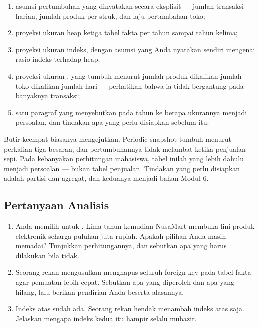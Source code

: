 \begin{enumerate}[leftmargin=1.4em]
  \item asumsi pertumbuhan yang dinyatakan secara eksplisit --- jumlah
        transaksi harian, jumlah produk per struk, dan laju pertambahan toko;
  \item proyeksi ukuran heap ketiga tabel fakta per tahun sampai tahun kelima;
  \item proyeksi ukuran indeks, dengan asumsi yang Anda nyatakan sendiri
        mengenai rasio indeks terhadap heap;
  \item proyeksi ukuran , yang tumbuh
        menurut jumlah produk dikalikan jumlah toko dikalikan jumlah hari ---
        perhatikan bahwa ia tidak bergantung pada banyaknya transaksi;
  \item satu paragraf yang menyebutkan pada tahun ke berapa ukurannya menjadi
        persoalan, dan tindakan apa yang perlu disiapkan sebelum itu.
\end{enumerate}

\begin{catatan}
Butir keempat biasanya mengejutkan. Periodic snapshot tumbuh menurut perkalian
tiga besaran, dan pertumbuhannya tidak melambat ketika penjualan sepi. Pada
kebanyakan perhitungan mahasiswa, tabel inilah yang lebih dahulu menjadi
persoalan --- bukan tabel penjualan. Tindakan yang perlu disiapkan adalah
partisi dan agregat, dan keduanya menjadi bahan Modul 6.
\end{catatan}

\subsection{Pertanyaan Analisis}

\begin{enumerate}[leftmargin=1.4em]
  \item Anda memilih  untuk . Lima
        tahun kemudian NusaMart membuka lini produk elektronik seharga puluhan
        juta rupiah. Apakah pilihan Anda masih memadai? Tunjukkan
        perhitungannya, dan sebutkan apa yang harus dilakukan bila tidak.
  \item Seorang rekan mengusulkan menghapus seluruh foreign key pada tabel
        fakta agar pemuatan lebih cepat. Sebutkan apa yang diperoleh dan apa
        yang hilang, lalu berikan pendirian Anda beserta alasannya.
  \item Indeks atas  sudah ada. Seorang
        rekan hendak menambah indeks atas  saja. Jelaskan
        mengapa indeks kedua itu hampir selalu mubazir.
\end{enumerate}


